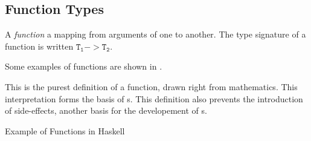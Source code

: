 \subsection{Function Types}\label{subsec:Function_Types}
\begin{definition}[Function]\label{def:Function}
  A \emph{function} a mapping from arguments of one  to another.
  The type signature of a function is written $\mathtt{T_{1}} -> \mathtt{T_{2}}$.

  Some examples of functions are shown in .

  \begin{remark}\label{rmk:Function_Definition_Pureness}
    This is the purest definition of a function, drawn right from mathematics.
    This interpretation forms the basis of s.
    This definition also prevents the introduction of side-effects, another basis for the developement of s.
  \end{remark}
\end{definition}

\begin{listing}[h!tbp]
\caption{Example of Functions in Haskell}
\label{lst:Function_Examples}
\end{listing}


